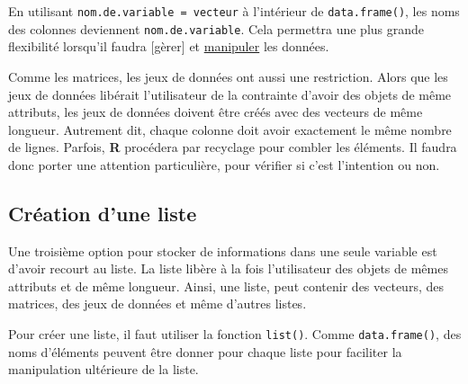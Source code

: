 \documentclass[
]{book}
\newenvironment{Shaded}{}{}
\newcommand{\AttributeTok}[1]{#1}
\newcommand{\CommentTok}[1]{\textit{#1}}
\newcommand{\DecValTok}[1]{#1}
\newcommand{\FunctionTok}[1]{#1}
\newcommand{\NormalTok}[1]{#1}
\newcommand{\OtherTok}[1]{#1}
\newcommand{\SpecialCharTok}[1]{#1}
\newcommand{\StringTok}[1]{#1}
\begin{document}
En utilisant \texttt{nom.de.variable\ =\ vecteur} à l'intérieur de \texttt{data.frame()}, les noms des colonnes deviennent \texttt{nom.de.variable}. Cela permettra une plus grande flexibilité lorsqu'il faudra {[}gèrer{]} et \protect\hyperlink{manipuler}{manipuler} les données.

Comme les matrices, les jeux de données ont aussi une restriction. Alors que les jeux de données libérait l'utilisateur de la contrainte d'avoir des objets de même attributs, les jeux de données doivent être créés avec des vecteurs de même longueur. Autrement dit, chaque colonne doit avoir exactement le même nombre de lignes. Parfois, \textbf{R} procédera par recyclage pour combler les éléments. Il faudra donc porter une attention particulière, pour vérifier si c'est l'intention ou non.

\hypertarget{cruxe9ation-dune-liste}{%
\subsection{Création d'une liste}\label{cruxe9ation-dune-liste}}

Une troisième option pour stocker de informations dans une seule variable est d'avoir recourt au liste. La liste libère à la fois l'utilisateur des objets de mêmes attributs et de même longueur. Ainsi, une liste, peut contenir des vecteurs, des matrices, des jeux de données et même d'autres listes.

Pour créer une liste, il faut utiliser la fonction \texttt{list()}. Comme \texttt{data.frame()}, des noms d'éléments peuvent être donner pour chaque liste pour faciliter la manipulation ultérieure de la liste.

\begin{Shaded}
\end{Shaded}
\end{document}
